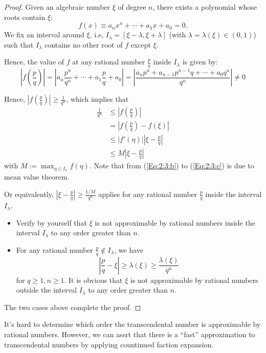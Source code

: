 \begin{proof}
Given an algebraic number $\xi$ of degree $n$, there exists a polynomial whose roots contain $\xi$:
\[
f(x) \equiv a_nx^n+\cdots+a_1x+a_0=0.
\]
We fix an interval around $\xi$, i.e, $I_\lambda = [\xi-\lambda,\xi+\lambda]$ (with $\lambda=\lambda(\xi)\in(0,1)$) such that $I_\lambda$ contains no other root of $f$ except $\xi$.

 Hence, the value of $f$ at any rational number $\frac{p}{q}$ inside $I_\lambda$ is given by:
\[
\left|f(\frac{p}{q})\right|=\left|a_n\frac{p^n}{q^n}+\cdots+a_1\frac{p}{q}+a_0\right|
=\left|\frac{a_np^n+a_{n-1}p^{n-1}q+\cdots+a_0q^n}{q^n}\right|\ne0
\]

Hence, $\left|f(\frac{p}{q})\right|\ge\frac{1}{q^n}$, which implies that
\begin{subequations}
\begin{align}
\frac{1}{q^n}&\le\left|f(\frac{p}{q})\right|\label{Eq:2:3:a} \\
				&= \left|f(\frac{p}{q})-f(\xi)\right|\label{Eq:2:3:b}\\
				&\le
|f'(\eta)||\xi-\frac{p}{q}|\label{Eq:2:3:c}\\
&\le M|\xi-\frac{p}{q}|\label{Eq:2:3:d}
\end{align}
\end{subequations}
with $M:=\max_{\eta\in I_\lambda}f(\eta)$. Note that from (\ref{Eq:2:3:b}) to (\ref{Eq:2:3:c}) is due to mean value theorem.

Or equivalently, $|\xi-\frac{p}{q}|\ge\frac{1/M}{q^n}$ applies for any rational number $\frac{p}{q}$ inside the interval $I_\lambda$. 
\begin{itemize}
\item
Verify by yourself that $\xi$ is not approximable by rational numbers inside the interval $I_\lambda$ to any order greater than $n$.
\item
For any rational number $\frac{p}{q}\notin I_\lambda$, we have 
\[
\left|\frac{p}{q}-\xi\right|\ge\lambda(\xi)\ge\frac{\lambda(\xi)}{q^n}
\]
for $q\ge1,n\ge1$. It is obvious that $\xi$ is not approximable by rational numbers outside the interval $I_\lambda$ to any order greater than $n$.
\end{itemize}
The two cases above complete the proof.
\end{proof}

It's hard to determine which order the transcendental number is approximable by rational numbers. However, we can assrt that there is a ``fast'' approximation to transcendental numbers by applying countinued faction expansion.
